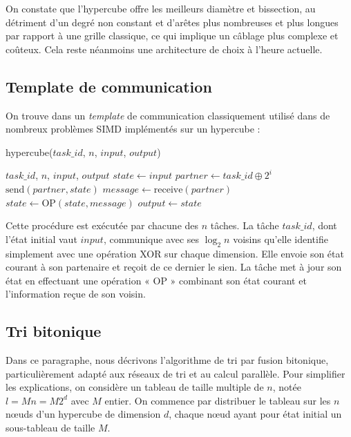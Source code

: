 On constate que l'hypercube offre les meilleurs diamètre et bissection, au détriment d'un degré non constant et d'arêtes plus nombreuses et plus longues par rapport à une grille classique, ce qui implique un câblage plus complexe et coûteux. Cela reste néanmoins une architecture de choix à l'heure actuelle.

\subsection{Template de communication}

On trouve dans \cite{FOSTER} un \textit{template} de communication classiquement utilisé dans de nombreux problèmes SIMD implémentés sur un hypercube :

\begin{algorithm}
\caption{hypercube($task\_id$, $n$, $input$, $output$)}
\begin{algorithmic}
\REQUIRE $task\_id$, $n$, $input$, $output$
\STATE $state \leftarrow input$
\STATE $partner \leftarrow task\_id \oplus 2^i$
\STATE $\text{send}(partner, state)$
\STATE $message \leftarrow \text{receive}(partner)$
\STATE $state \leftarrow \text{OP}(state, message)$
\ENDFOR
\STATE $output \leftarrow state$
\end{algorithmic}
\end{algorithm}

Cette procédure est exécutée par chacune des $n$ tâches. La tâche $task\_id$, dont l'état initial vaut $input$, communique avec ses $\log_2 n$ voisins qu'elle identifie simplement avec une opération XOR sur chaque dimension. Elle envoie son état courant à son partenaire et reçoit de ce dernier le sien. La tâche met à jour son état en effectuant une opération « OP » combinant son état courant et l'information reçue de son voisin.

\subsection{Tri bitonique}

Dans ce paragraphe, nous décrivons l'algorithme de tri par fusion bitonique, particulièrement adapté aux réseaux de tri et au calcul parallèle. Pour simplifier les explications, on considère un tableau de taille multiple de $n$, notée $l = Mn = M2^d$ avec $M$ entier. On commence par distribuer le tableau sur les $n$ nœuds d'un hypercube de dimension $d$, chaque nœud ayant pour état initial un sous-tableau de taille $M$.

